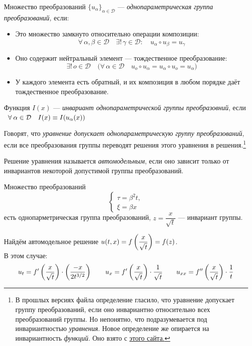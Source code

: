 \documentclass[../main.tex]{subfiles}
\begin{document}
\begin{definition} 
Множество преобразований $\{u_{\alpha}\}_{\alpha \in \mathcal{D}}$ --- \emph{однопараметрическая группа преобразований,} если:
\begin{itemize}
	\item Это множество замкнуто относительно операции композиции:
	$$\forall\, \alpha, \beta \in \mathcal{D} \quad \exists!\,\gamma \in \mathcal{D}\colon \quad u_\alpha \circ u_\beta = u_\gamma$$
	
	\item Оно содержит нейтральный элемент --- тождественное преобразование:
	$$\exists!\, o \in \mathcal{D} \quad \bigl(\forall\, \alpha \in \mathcal{D} \quad u_o \circ u_\alpha = u_\alpha \circ u_o = u_\alpha \bigr)$$
	
	\item У каждого элемента есть обратный, и их композиция в любом порядке даёт тождественное преобразование.
\end{itemize}
\end{definition}
	
\begin{definition}
	Функция $I(x)$ --- \textit{инвариант однопараметрической группы преобразовний}, если $\;\;\forall\: \alpha \in \mathcal{D} \quad I(x) \equiv I(u_{\alpha}(x))$
	\end{definition}
	\begin{definition}
	Говорят, что \textit{уравнение допускает однопараметрическую группу преобразований}, если все преобразования группы переводят решения этого уравнения в решения.\footnote{В прошлых версиях файла определение гласило, что уравнение допускает группу преобразований, если оно инвариантно относительно всех преобразований группы. Но непонятно, что подразумевается под инвариантностью \emph{уравнения}. Новое определение же опирается на инвариантность \emph{функций}. Оно взято с \href{https://matem.anrb.ru/bsuconf/2012/adlerv7.pdf}{этого сайта.}}
\end{definition}

\begin{definition}
Решение уравнения называется \textit{автомодельным}, если оно зависит только от инвариантов некоторой допустимой группы преобразований.
\end{definition}
\begin{example}
Множество преобразований
\begin{equation*}
\begin{cases}
	\tau = \beta^2 t, \\
	\xi = \beta x
\end{cases}
\end{equation*}
есть однопарметрическая группа преобразований, $z = \dfrac{x}{\sqrt{t}} $ --- инвариант группы.
\end{example}
Найдём автомодельное решение $u(t, x) = f\left(\dfrac{x}{\sqrt{t}}\right) = f(z)$. \\
В этом случае:
\begin{equation*}
	u_t = f'\left(\dfrac{x}{\sqrt{t}}\right) \cdot \left(\frac{-x}{2t^{3/2}}\right) 
	\qquad u_x = f'\left(\frac{x}{\sqrt{t}}\right) \cdot \frac{1}{\sqrt{t}} 
	\qquad u_{xx} = f''\left(\frac{x}{\sqrt{t}}\right) \cdot \frac{1}{t}
\end{equation*}
\end{document}
